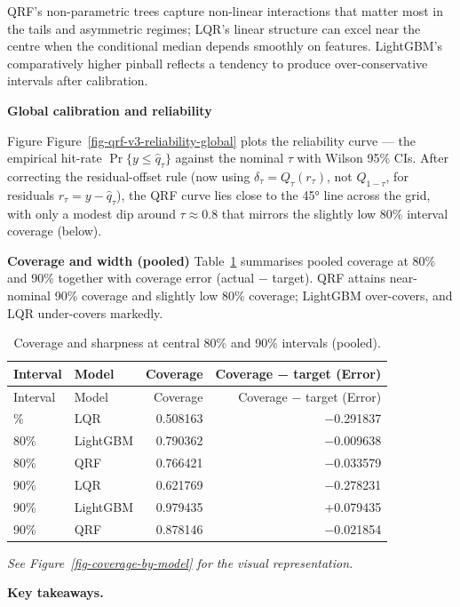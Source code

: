 \documentclass[
  a4paper,
  DIV=11,
  numbers=noendperiod]{scrreprt}
\begin{document}
QRF's non-parametric trees capture non-linear interactions that matter
most in the tails and asymmetric regimes; LQR's linear structure can
excel near the centre when the conditional median depends smoothly on
features. LightGBM's comparatively higher pinball reflects a tendency to
produce over-conservative intervals after calibration.

\textbf{Global calibration and reliability}

Figure Figure~\ref{fig-qrf-v3-reliability-global} plots the reliability
curve --- the empirical hit-rate \(\Pr\{y\le \hat q_\tau\}\) against the
nominal \(\tau\) with Wilson 95\% CIs. After correcting the
residual-offset rule (now using \(\delta_\tau = Q_\tau(r_\tau)\), not
\(Q_{1-\tau}\), for residuals \(r_\tau = y - \hat q_\tau\)), the QRF
curve lies close to the 45° line across the grid, with only a modest dip
around \(\tau\approx0.8\) that mirrors the slightly low 80\% interval
coverage (below).

\textbf{Coverage and width (pooled)} Table~\ref{tbl-cov-width}
summarises pooled coverage at 80\% and 90\% together with coverage error
(actual − target). QRF attains near-nominal 90\% coverage and slightly
low 80\% coverage; LightGBM over-covers, and LQR under-covers markedly.

\begin{longtable}[]{@{}llrr@{}}
\caption{Coverage and sharpness at central 80\% and 90\% intervals
(pooled).}\label{tbl-cov-width}\tabularnewline
\toprule\noalign{}
Interval & Model & Coverage & Coverage − target (Error) \\
\midrule\noalign{}
\endfirsthead
\toprule\noalign{}
Interval & Model & Coverage & Coverage − target (Error) \\
\midrule\noalign{}
\endhead
\bottomrule\noalign{}
\endlastfoot
80\% & LQR & 0.508163 & −0.291837 \\
80\% & LightGBM & 0.790362 & −0.009638 \\
80\% & QRF & 0.766421 & −0.033579 \\
90\% & LQR & 0.621769 & −0.278231 \\
90\% & LightGBM & 0.979435 & +0.079435 \\
90\% & QRF & 0.878146 & −0.021854 \\
\end{longtable}

\emph{See Figure~\ref{fig-coverage-by-model} for the visual
representation.}

\textbf{Key takeaways.}
\end{document}

